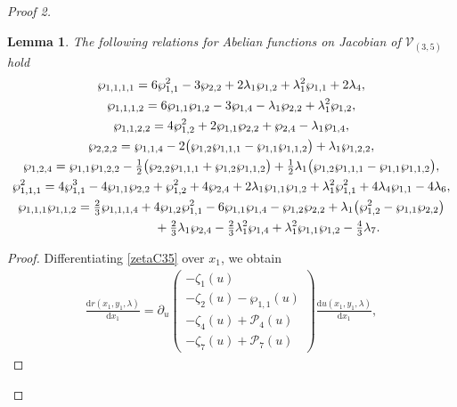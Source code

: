 \documentclass[pdftex]{sigma}
\numberwithin{equation}{section}
\newtheorem{Lemma}[Theorem]{Lemma}
\newcommand{\rmd}{\mathrm{d}}
\begin{document}
\begin{proof}[Proof 2]
\begin{Lemma}\label{L:ind4WPC35} The following relations for Abelian functions on Jacobian of $\mathcal{V}_{(3,5)}$ hold
\begin{subequations}\label{C35WP4rel}
\begin{gather}
\wp_{1,1,1,1} = 6 \wp_{1,1}^2 - 3\wp_{2,2} + 2 \lambda_1 \wp_{1,2} + \lambda_1^2 \wp_{1,1} + 2\lambda_4,\label{wp1111RelC35} \\
 \wp_{1,1,1,2} = 6\wp_{1,1}\wp_{1,2} - 3 \wp_{1,4} - \lambda_1 \wp_{2,2} + \lambda_1^2 \wp_{1,2}, \label{wp1112RelC35} \\
 \wp_{1,1,2,2} = 4\wp_{1,2}^2 + 2\wp_{1,1}\wp_{2,2} + \wp_{2,4} - \lambda_1 \wp_{1,4}, \label{wp1122RelC35} \\
 \wp_{2,2,2} = \wp_{1,1,4} - 2 \big(\wp_{1,2}\wp_{1,1,1} - \wp_{1,1}\wp_{1,1,2}\big) + \lambda_1 \wp_{1,2,2}, \label{wp222RelC35}\\
 \wp_{1,2,4} = \wp_{1,1}\wp_{1,2,2} - \tfrac{1}{2} \big(\wp_{2,2}\wp_{1,1,1}+\wp_{1,2}\wp_{1,1,2}\big) + \tfrac{1}{2}\lambda_1 \big(\wp_{1,2}\wp_{1,1,1}-\wp_{1,1}\wp_{1,1,2}\big),\label{wp124RelC35}\\
 \wp_{1,1,1}^2 = 4\wp_{1,1}^3 - 4\wp_{1,1}\wp_{2,2} + \wp_{1,2}^2 + 4\wp_{2,4} + 2\lambda_1 \wp_{1,1}\wp_{1,2} +\lambda_1^2 \wp_{1,1}^2 + 4\lambda_4 \wp_{1,1} - 4\lambda_6, \label{wp111SqRelC35} \\
\wp_{1,1,1}\wp_{1,1,2} = \tfrac{2}{3}\wp_{1,1,1,4} + 4 \wp_{1,2}\wp_{1,1}^2 - 6 \wp_{1,1}\wp_{1,4}
 - \wp_{1,2}\wp_{2,2} + \lambda_1 \big(\wp_{1,2}^2 - \wp_{1,1}\wp_{2,2}\big)\notag\\
\hphantom{\wp_{1,1,1}\wp_{1,1,2} =}{} +\tfrac{2}{3} \lambda_1 \wp_{2,4} - \tfrac{2}{3} \lambda_1^2 \wp_{1,4} + \lambda_1^2 \wp_{1,1}\wp_{1,2} -\tfrac{4}{3} \lambda_7.\label{wp1114RelC35}
\end{gather}
\end{subequations}
\end{Lemma}
\begin{proof} Differentiating \eqref{zetaC35} over $x_1$, we obtain
\begin{gather*}
 \frac{\rmd r(x_1,y_1,\lambda)}{\rmd x_1} = \partial_{u} \begin{pmatrix}
 -\zeta_1(u) \\
 -\zeta_2(u) - \wp_{1,1}(u)\\
 -\zeta_4(u) + \mathcal{P}_4(u) \\
 -\zeta_7(u) + \mathcal{P}_7(u) \end{pmatrix} \frac{\rmd u(x_1,y_1,\lambda)}{\rmd x_1},

\end{gather*}
\end{proof}
\end{proof}
\end{document}
